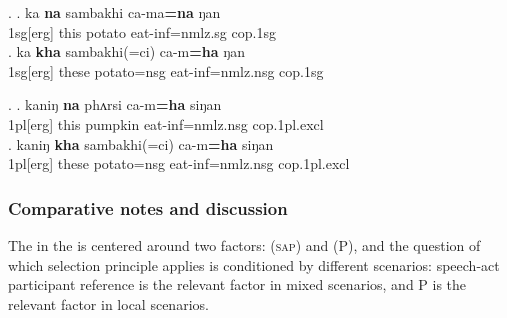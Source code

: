 \ex. \ag. ka {\bf na} sambakhi ca-ma{\bf =na} ŋan\\
{\sc 1sg[erg]} this potato eat-{\sc inf=nmlz.sg} {\sc cop.1sg}\\
\bg.  ka {\bf kha} sambakhi(=ci) ca-m{\bf =ha} ŋan \\
{\sc 1sg[erg]} these potato{\sc =nsg} eat-{\sc inf=nmlz.nsg} {\sc cop.1sg}\\

\ex. \ag. kaniŋ {\bf na} phʌrsi ca-m{\bf =ha} siŋan\\
{\sc 1pl[erg]} this pumpkin eat-{\sc inf=nmlz.nsg} {\sc cop.1pl.excl}\\
\bg.  kaniŋ {\bf kha} sambakhi(=ci) ca-m{\bf =ha} siŋan \\
{\sc 1pl[erg]} these potato{\sc =nsg} eat-{\sc inf=nmlz.nsg} {\sc cop.1pl.excl}\\

\subsubsection{Comparative notes and discussion}


The  in the  is centered around two factors: (\textsc{sap}) and (P), and the question of which selection principle applies is conditioned by different scenarios: speech-act participant reference is the relevant factor in mixed scenarios, and P is the relevant factor in local scenarios. 

